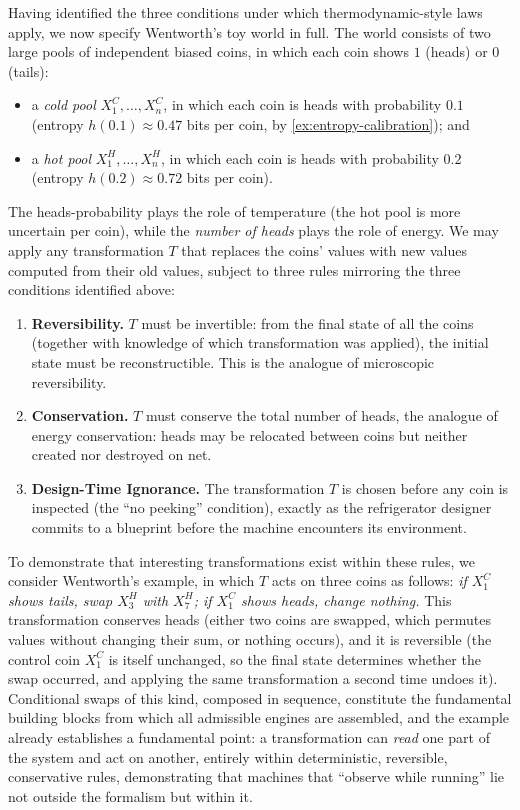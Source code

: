 \documentclass[11pt]{article}
\begin{document}
Having identified the three conditions under which thermodynamic-style laws apply, we now specify Wentworth's toy world in full. The world consists of two large pools of independent biased coins, in which each coin shows $1$ (heads) or $0$ (tails):

\begin{itemize}[leftmargin=2em]
  \item a \emph{cold pool} $X^C_1, \dots, X^C_n$, in which each coin is heads with probability $0.1$ (entropy $h(0.1) \approx 0.47$ bits per coin, by \cref{ex:entropy-calibration}); and
  \item a \emph{hot pool} $X^H_1, \dots, X^H_n$, in which each coin is heads with probability $0.2$ (entropy $h(0.2) \approx 0.72$ bits per coin).
\end{itemize}

The heads-probability plays the role of temperature (the hot pool is more uncertain per coin), while the \emph{number of heads} plays the role of energy. We may apply any transformation $T$ that replaces the coins' values with new values computed from their old values, subject to three rules mirroring the three conditions identified above:

\begin{enumerate}[leftmargin=2em]
  \item \textbf{Reversibility.} $T$ must be invertible: from the final state of all the coins (together with knowledge of which transformation was applied), the initial state must be reconstructible. This is the analogue of microscopic reversibility.
  \item \textbf{Conservation.} $T$ must conserve the total number of heads, the analogue of energy conservation: heads may be relocated between coins but neither created nor destroyed on net.
  \item \textbf{Design-Time Ignorance.} The transformation $T$ is chosen before any coin is inspected (the ``no peeking'' condition), exactly as the refrigerator designer commits to a blueprint before the machine encounters its environment.
\end{enumerate}

To demonstrate that interesting transformations exist within these rules, we consider Wentworth's example, in which $T$ acts on three coins as follows: \emph{if $X^C_1$ shows tails, swap $X^H_3$ with $X^H_7$; if $X^C_1$ shows heads, change nothing.} This transformation conserves heads (either two coins are swapped, which permutes values without changing their sum, or nothing occurs), and it is reversible (the control coin $X^C_1$ is itself unchanged, so the final state determines whether the swap occurred, and applying the same transformation a second time undoes it). Conditional swaps of this kind, composed in sequence, constitute the fundamental building blocks from which all admissible engines are assembled, and the example already establishes a fundamental point: a transformation can \emph{read} one part of the system and act on another, entirely within deterministic, reversible, conservative rules, demonstrating that machines that ``observe while running'' lie not outside the formalism but within it.
\end{document}
